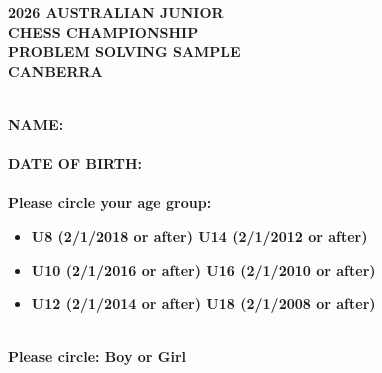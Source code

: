 \documentclass[14pt]{article}
\begin{document}
\begin{titlepage}
\thispagestyle{fancy}


\begin{center}
\vspace{20mm}
\textbf{\Huge 2026 AUSTRALIAN JUNIOR}\\
\vspace{6mm}
\textbf{\Huge CHESS CHAMPIONSHIP}\\
\vspace{6mm}
\textbf{\Huge PROBLEM SOLVING SAMPLE}\\
\vspace{6mm}
\textbf{\Huge CANBERRA}\\
\end{center}

\vspace{8mm}\\
\textbf{\LARGE NAME: \hspace{3mm} \underline{\hspace{8cm}}}\\
\vspace{5mm}\\
\textbf{\LARGE DATE OF BIRTH: \hspace{3mm} \underline{\hspace{5cm}}}\\
\vspace{5mm}\\

\textbf{\LARGE Please circle your age group:}\\
\begin{itemize}
  \item \textbf{\Large  U8 (2/1/2018 or after)    U14 (2/1/2012 or after)}
  \item \textbf{\Large  U10 (2/1/2016 or after)   U16 (2/1/2010 or after)}
  \item \textbf{\Large  U12 (2/1/2014 or after)   U18 (2/1/2008 or after)}
\end{itemize}
\vspace{5mm}\\

\textbf{\LARGE Please circle: Boy or Girl}\\
\vspace{5mm}\\


\end{titlepage}
\end{document}

